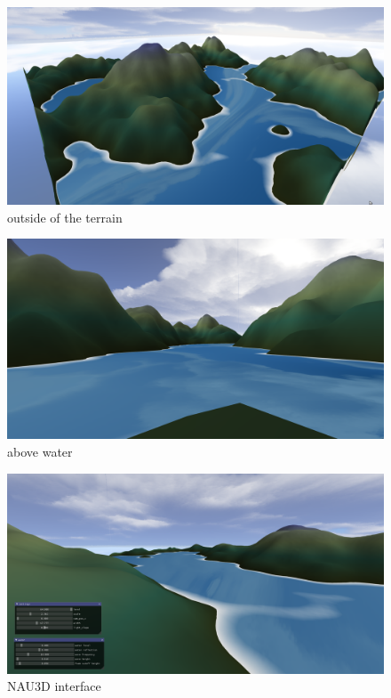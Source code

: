 \documentclass[a4paper]{report}
\begin{document}
\begin{figure}[H]
  \centering
  \includegraphics[width=\textwidth]{images/results1.png}
  \caption{outside of the terrain}
\end{figure}

\begin{figure}[H]
  \centering
  \includegraphics[width=\textwidth]{images/results2.png}
  \caption{above water}
\end{figure}

\begin{figure}[H]
  \centering
  \includegraphics[width=\textwidth]{images/results3.png}
  \caption{NAU3D interface}
\end{figure}
\end{document}
